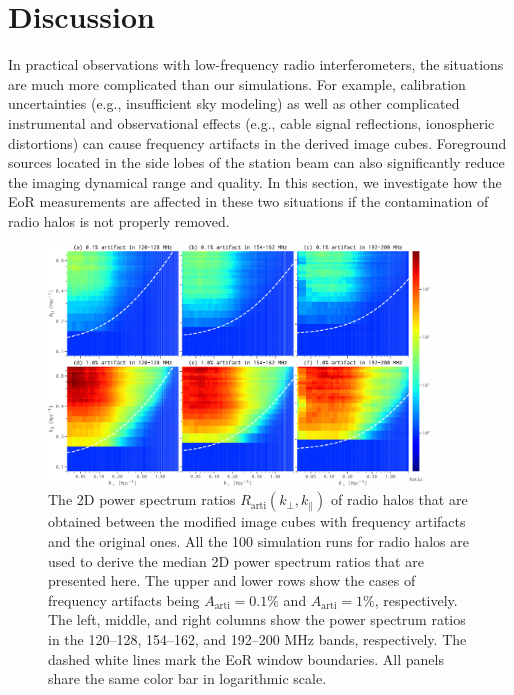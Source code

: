 \documentclass[twocolumn]{aastex62}
\newcommand{\R}[1]{\mathrm{#1}}
\newcommand{\klos}{\text{$k_{\parallel}$}}
\newcommand{\kperp}{\text{$k_{\bot}$}}
\begin{document}
\section{Discussion}
\label{sec:discussions}

In practical observations with low-frequency radio interferometers, the
situations are much more complicated than our simulations.
For example, calibration uncertainties (e.g., insufficient sky modeling)
as well as other complicated instrumental and observational effects
(e.g., cable signal reflections, ionospheric distortions) can cause
frequency artifacts in the derived image cubes.
Foreground sources located in the side lobes of the station beam can
also significantly reduce the imaging dynamical range and quality.
In this section, we investigate how the EoR measurements are affected
in these two situations if the contamination of radio halos is not
properly removed.

\begin{figure}
  \centering
  \includegraphics[width=0.9\textwidth]{ps2d-ratio-crp-halos-3bands}
  \caption{\label{fig:ps2d-ratio-crp}%
    The 2D power spectrum ratios $R_{\R{arti}}(\kperp, \klos)$ of radio
    halos that are obtained between the modified image cubes with
    frequency artifacts and the original ones.
    All the 100 simulation runs for radio halos are used to derive
    the median 2D power spectrum ratios that are presented here.
    The upper and lower rows show the cases of frequency artifacts
    being $A_{\R{arti}} = 0.1\%$ and $A_{\R{arti}} = 1\%$, respectively.
    The left, middle, and right columns show the power spectrum ratios
    in the \numrange{120}{128}, \numrange{154}{162}, and
    \numrange{192}{200} \si{\MHz} bands, respectively.
    The dashed white lines mark the EoR window boundaries.
    All panels share the same color bar in logarithmic scale.
  }
\end{figure}
\end{document}
